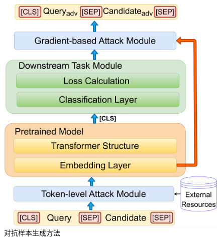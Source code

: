 \begin{figure}[h]
    \centering
      \includegraphics[width=0.5\columnwidth]{fig/fig3-2.pdf}
    \caption{对抗样本生成方法}
    \label{fig3-2}
\end{figure}